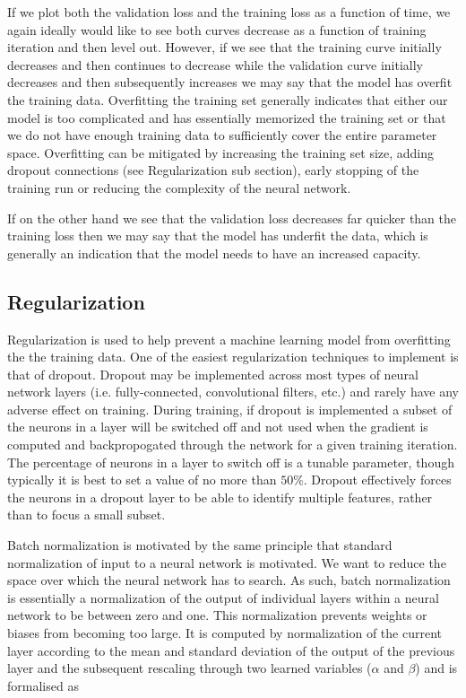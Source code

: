 If we plot both the validation loss and the training loss as a function of time, we again ideally would like to see both curves decrease as a function of training iteration and then level out. However, if we see that the training curve initially decreases and then continues to decrease while the validation curve initially decreases and then subsequently increases we may say that the model has overfit the training data. Overfitting the training set generally indicates that either our model is too complicated and has essentially memorized the training set or that we do not have enough training data to sufficiently cover the entire parameter space. Overfitting can be mitigated by increasing the training set size, adding dropout connections (see Regularization sub section), early stopping of the training run or reducing the complexity of the neural network.

If on the other hand we see that the validation loss decreases far quicker than the training loss then we may say that the model has underfit the data, which is generally an indication that the model needs to have an increased capacity.

%
%
\subsection{Regularization}

%
%
Regularization is used to help prevent a machine learning model from overfitting the the training data. One of the easiest regularization techniques to implement is that of dropout. Dropout may be implemented across most types of neural network layers (i.e. fully-connected, convolutional filters, etc.) and rarely have any adverse effect on training. During training, if dropout is implemented a subset of the neurons in a layer will be switched off and not used when the gradient is computed and backpropogated through the network for a given training iteration. The percentage of neurons in a layer to switch off is a tunable parameter, though typically it is best to set a value of no more than $50\%$. Dropout effectively forces the neurons in a dropout layer to be able to identify multiple features, rather than to focus a small subset.

%
%
Batch normalization is motivated by the same principle that standard normalization of input to a neural network is motivated. We want to reduce the space over which the neural network has to search. As such, batch normalization is essentially a normalization of the output of individual layers within a neural network to be between zero and one. This normalization prevents weights or biases from becoming too large. It is computed by normalization of the current layer according to the mean and standard deviation of the output of the previous layer and the subsequent rescaling through two learned variables ($\alpha$ and $\beta$) and is formalised as 

